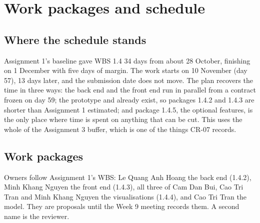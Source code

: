 \section{Work packages and schedule}
\label{sec:schedule}

\subsection{Where the schedule stands}

Assignment 1's baseline gave WBS 1.4 34 days from about 28 October, finishing on 1 December with
five days of margin. The work starts on 10 November (day 57), 13 days later, and the submission date
does not move. The plan recovers the time in three ways: the back end and the front end run in
parallel from a contract frozen on day 59; the prototype and  already exist, so
packages 1.4.2 and 1.4.3 are shorter than Assignment 1 estimated; and package 1.4.5, the optional
features, is the only place where time is spent on anything that can be cut. This uses the whole of
the Assignment 3 buffer, which is one of the things CR-07 records.

\subsection{Work packages}
\label{sec:wp}

Owners follow Assignment 1's WBS: Le Quang Anh Hoang the back end (1.4.2), Minh Khang Nguyen the
front end (1.4.3), all three of Cam Dan Bui, Cao Tri Tran and Minh Khang Nguyen the visualisations
(1.4.4), and Cao Tri Tran the model. They are proposals until the Week 9 meeting records them.
A second name is the reviewer.

